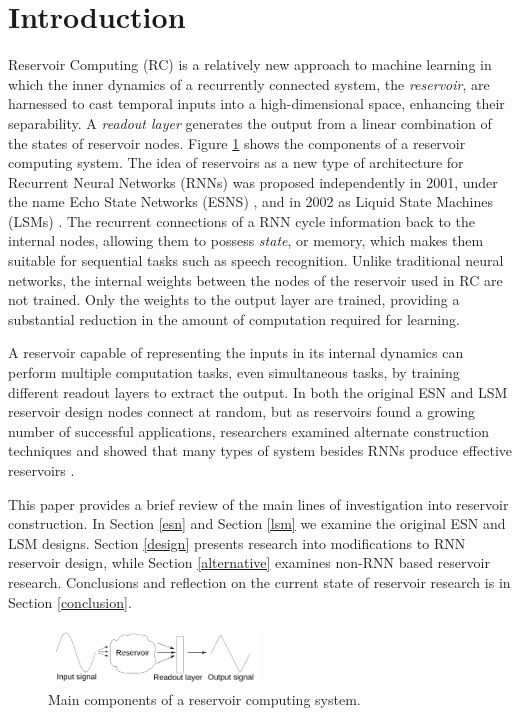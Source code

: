 \documentclass{article}
\begin{document}
\section{Introduction}\label{introduction}
Reservoir Computing (RC) is a relatively new approach to machine learning in 
which  the inner dynamics of a recurrently connected system, the 
\textit{reservoir}, are harnessed to cast temporal inputs into a 
high-dimensional space, enhancing their separability.  A \textit{readout layer} 
generates the output from a linear combination of the states of reservoir 
nodes. Figure \ref{reservoir_layout} shows the components of a reservoir 
computing system. The idea of reservoirs as a new type of architecture for 
Recurrent Neural Networks (RNNs) was proposed independently in 2001, under the 
name Echo State Networks (ESNS) \cite{jaeger2001echo}, and in 2002 as Liquid 
State Machines (LSMs) \cite{maass2002real}. The recurrent connections of a RNN 
cycle information back to the internal nodes, allowing them to possess 
\textit{state}, or memory, which makes them suitable for sequential tasks such 
as speech recognition. Unlike traditional neural networks, the internal weights 
between the nodes of the reservoir used in RC are not trained.  Only the 
weights to the output layer are trained, providing a substantial reduction in 
the amount of computation required for learning. \par  A reservoir capable of 
representing the inputs in its internal dynamics can perform multiple 
computation tasks, even simultaneous tasks, by training different readout 
layers to extract the output. In both the original ESN and LSM reservoir design
nodes connect at random, but as reservoirs found a growing number of successful 
applications, researchers examined alternate construction techniques 
\cite{lukovsevicius2007overview} and showed that many types of system besides 
RNNs produce effective reservoirs \cite{tanaka2018recent}.\par
   
    This paper provides a  brief review of the main lines of investigation into 
    reservoir construction. In Section \ref{esn} and Section \ref{lsm} we 
    examine the original ESN and LSM designs. Section \ref{design} presents 
    research into modifications to RNN reservoir design, while Section 
    \ref{alternative} examines non-RNN based
    reservoir research.  Conclusions and reflection on the current state of 
    reservoir research is in Section \ref{conclusion}.  \begin{figure}[ht]
        \centering
            \includegraphics[width=0.5\textwidth]{reservoir_layout.png}
    \caption{Main components of a reservoir computing system. 
        \cite{bye2016investigation}}
            \label{reservoir_layout}
            \end{figure}
\end{document}
